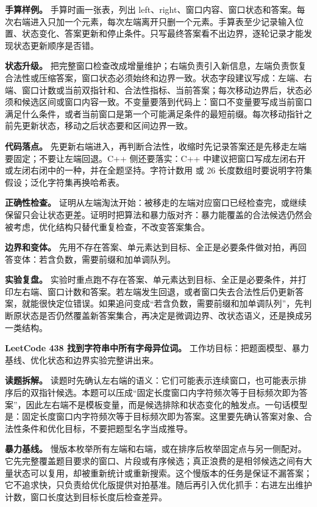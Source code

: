 \textbf{手算样例。} 手算时画一张表，列出 left、right、窗口内容、窗口状态和答案。每次右端进入只加一个元素，每次左端离开只删一个元素。手算表至少记录输入位置、状态变化、答案更新和停止条件。只写最终答案看不出边界，逐轮记录才能发现状态更新顺序是否错。

\textbf{状态升级。} 把完整窗口检查改成增量维护；右端负责引入新信息，左端负责恢复合法性或压缩答案，窗口状态必须始终和边界一致。状态字段建议写成：左端、右端、窗口计数或当前双指针和、合法性指标、当前答案；每次移动边界后，状态必须和候选区间或窗口内容一致。不变量要落到代码上：窗口不变量要写成当前窗口满足什么条件，或者当前窗口是第一个可能满足条件的最短前缀。每次移动指针之前先更新状态，移动之后状态要和区间边界一致。

\textbf{代码落点。} 先更新右端进入，再判断合法性，收缩时先记录答案还是先移走左端要固定；不要让左端回退。C++ 侧还要落实：C++ 中建议把窗口写成左闭右开或左闭右闭中的一种，并在全题坚持。字符计数用  或 26 长度数组时要说明字符集假设；泛化字符集再换哈希表。

\textbf{正确性检查。} 证明从左端淘汰开始：被移走的左端对应窗口已经检查完，或继续保留只会让状态更差。证明时把算法和暴力版对齐：暴力能覆盖的合法候选仍然会被考虑，优化结构只替代重复检查，不改变答案集合。

\textbf{边界和变体。} 先用不存在答案、单元素达到目标、全正是必要条件做对拍，再回答变体：若含负数，需要前缀和加单调队列。

\textbf{实验复盘。} 实验时重点跑不存在答案、单元素达到目标、全正是必要条件，并打印左右端、窗口计数和答案。若左端发生回退，或者窗口失去合法性后仍更新答案，就能很快定位错误。如果追问变成“若含负数，需要前缀和加单调队列”，先判断原状态是否仍然覆盖新答案集合，再决定是微调边界、改状态语义，还是换成另一类结构。

\noindent\textbf{LeetCode 438 找到字符串中所有字母异位词。} 工作坊目标：把题面模型、暴力基线、优化状态和边界实验完整讲出来。

\textbf{读题拆解。} 读题时先确认左右端的语义：它们可能表示连续窗口，也可能表示排序后的双指针候选。本题可以压成“固定长度窗口内字符频次等于目标频次即为答案”，因此左右端不是模板变量，而是候选排除和状态变化的触发点。一句话模型是：固定长度窗口内字符频次等于目标频次即为答案。这里要先确认答案对象、合法性条件和优化目标，不要把题型名字当成推导。

\textbf{暴力基线。} 慢版本枚举所有左端和右端，或在排序后枚举固定点与另一侧配对。它先完整覆盖题目要求的窗口、片段或有序候选；真正浪费的是相邻候选之间有大量状态可以复用，却被重新统计或重新搜索。这个慢版本的任务是保证不漏答案；它不追求快，只负责给优化版提供对拍基准。随后再引入优化抓手：右进左出维护计数，窗口长度达到目标长度后检查差异。

